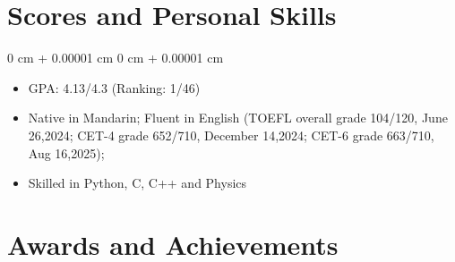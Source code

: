 \documentclass[10pt, letterpaper]{article}
\newenvironment{highlights}{
    \begin{itemize}[
        topsep=0.10 cm,
        parsep=0.10 cm,
        partopsep=0pt,
        itemsep=0pt,
        leftmargin=0 cm + 10pt
    ]
}{
    \end{itemize}
} %
\newenvironment{onecolentry}{
    \begin{adjustwidth}{
        0 cm + 0.00001 cm
    }{
        0 cm + 0.00001 cm
    }
}{
    \end{adjustwidth}
} %
\begin{document}
    \section{Scores and Personal Skills}
        \vspace{0.10 cm}
        \begin{onecolentry}
            \begin{highlights}
            \item GPA: 4.13/4.3 (Ranking: 1/46)
                \item Native in Mandarin; Fluent in English (TOEFL overall grade 104/120, June 26,2024; CET-4 grade 652/710, December 14,2024; CET-6 grade 663/710, Aug 16,2025);
                \item Skilled in Python, C, C++ and Physics
            \end{highlights}
        \end{onecolentry}





    
    \section{Awards and Achievements }
\end{document}
